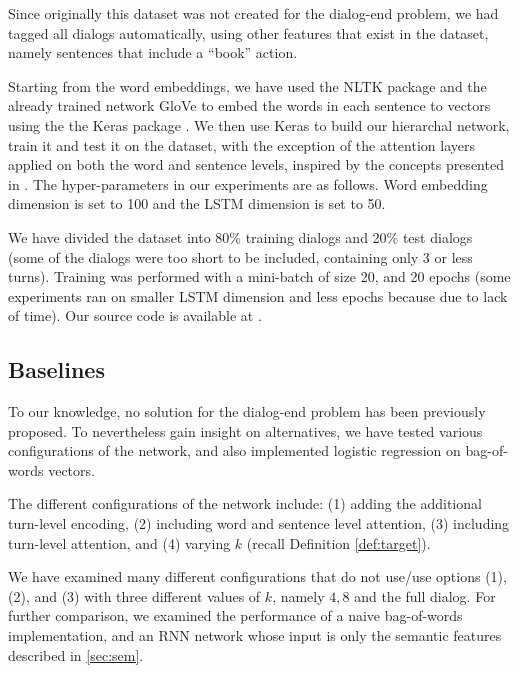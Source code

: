 Since originally this dataset was not created for the dialog-end problem, 
we had tagged all dialogs automatically, using other features that exist 
in the dataset, namely sentences that include a ``book'' action. 

Starting from the word embeddings, we have used the 
NLTK package \cite{DBLP:conf/acl/Bird06} and the already trained network GloVe \cite{glove} 
to embed the words in each sentence to vectors using the the Keras package \cite{chollet2015}. 
We then use Keras to build our hierarchal network, train it and test it on the 
dataset, with the exception of the attention layers applied on both the word and sentence 
levels, inspired by the concepts presented in \cite{attention}. 
The hyper-parameters in our experiments are as follows. 
Word embedding dimension is set to 100 and the 
LSTM dimension is set to 50. 

We have divided the dataset into 80\% training dialogs and 20\% test dialogs 
(some of the dialogs were too short to be included, containing only 3 or less turns).
Training was performed with a mini-batch of size 20, 
and 20 epochs (some experiments ran on smaller LSTM dimension and less epochs because due to 
lack of time). Our source code is available at \cite{code}.

\subsection{Baselines}%
To our knowledge, no solution for the 
dialog-end problem has been previously proposed. To nevertheless
gain insight on alternatives, we have tested various configurations 
of the network, and also implemented logistic regression on bag-of-words vectors.

The different configurations of the network include: 
(1) adding the additional turn-level encoding, 
(2) including word and sentence level attention, 
(3) including turn-level attention, and 
(4) varying $k$ (recall Definition \ref{def:target}).

We have examined many different configurations that do not use/use options 
(1), (2), and (3) with three different values of $k$, namely $4,8$ and 
the full dialog. 
For further comparison, we examined the performance of a naive bag-of-words 
implementation, and an RNN network whose input is only the semantic features described in \ref{sec:sem}. 


